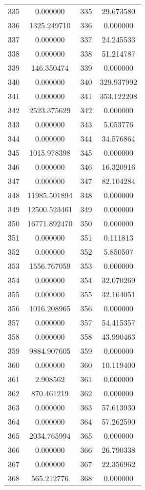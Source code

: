 \documentclass[12pt]{article}
\begin{document}
\begin{longtable}{@{}cccc@{}}
335 & 0.000000 & 335 & 29.673580 \\
336 & 1325.249710 & 336 & 0.000000 \\
337 & 0.000000 & 337 & 24.245533 \\
338 & 0.000000 & 338 & 51.214787 \\
339 & 146.350474 & 339 & 0.000000 \\
340 & 0.000000 & 340 & 329.937992 \\
341 & 0.000000 & 341 & 353.122208 \\
342 & 2523.375629 & 342 & 0.000000 \\
343 & 0.000000 & 343 & 5.053776 \\
344 & 0.000000 & 344 & 34.576864 \\
345 & 1015.978398 & 345 & 0.000000 \\
346 & 0.000000 & 346 & 16.320916 \\
347 & 0.000000 & 347 & 82.104284 \\
348 & 11985.501894 & 348 & 0.000000 \\
349 & 12500.523461 & 349 & 0.000000 \\
350 & 16771.892470 & 350 & 0.000000 \\
351 & 0.000000 & 351 & 0.111813 \\
352 & 0.000000 & 352 & 5.850507 \\
353 & 1556.767059 & 353 & 0.000000 \\
354 & 0.000000 & 354 & 32.070269 \\
355 & 0.000000 & 355 & 32.164051 \\
356 & 1016.208965 & 356 & 0.000000 \\
357 & 0.000000 & 357 & 54.415357 \\
358 & 0.000000 & 358 & 43.990463 \\
359 & 9884.907605 & 359 & 0.000000 \\
360 & 0.000000 & 360 & 10.119400 \\
361 & 2.908562 & 361 & 0.000000 \\
362 & 870.461219 & 362 & 0.000000 \\
363 & 0.000000 & 363 & 57.613930 \\
364 & 0.000000 & 364 & 57.262590 \\
365 & 2034.765994 & 365 & 0.000000 \\
366 & 0.000000 & 366 & 26.790338 \\
367 & 0.000000 & 367 & 22.356962 \\
368 & 565.212776 & 368 & 0.000000 \\

\end{longtable}
\end{document}
